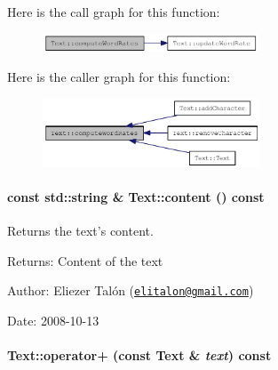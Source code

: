 Here is the call graph for this function:\nopagebreak
\begin{figure}[H]
\begin{center}
\leavevmode
\includegraphics[width=182pt]{class_text_efd7305b29212ad1db1a51bb1081b770_cgraph}
\end{center}
\end{figure}


Here is the caller graph for this function:\nopagebreak
\begin{figure}[H]
\begin{center}
\leavevmode
\includegraphics[width=184pt]{class_text_efd7305b29212ad1db1a51bb1081b770_icgraph}
\end{center}
\end{figure}
\hypertarget{class_text_8b6ac381338c5b3f719600b5f9be222c}{
\paragraph[{content}]{\setlength{\rightskip}{0pt plus 5cm}const std::string \& Text::content () const}\hfill}
\label{class_text_8b6ac381338c5b3f719600b5f9be222c}


Returns the text's content. 

\begin{Desc}
\item[Returns:]Content of the text\end{Desc}
\begin{Desc}
\item[Author:]Eliezer Talón (\href{mailto:elitalon@gmail.com}{\tt elitalon@gmail.com}) \end{Desc}
\begin{Desc}
\item[Date:]2008-10-13 \end{Desc}
\hypertarget{class_text_c8887fb224e0402448ede4f3b9f7452d}{
\paragraph[{operator+}]{ Text::operator+ (const {\bf Text} \& {\em text}) const}\hfill}
\label{class_text_c8887fb224e0402448ede4f3b9f7452d}


